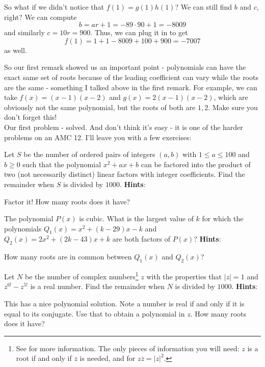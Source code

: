\documentclass[11pt,titlepage]{scrartcl}
\newenvironment{hint}{\footnotesize \normalfont \textbf{Hints}:}{\hspace{-0.5ex}}
\begin{document}
\begin{remark}
So what if we didn't notice that $f(1)=g(1)h(1)$? We can still find $b$ and $c$, right? We can compute
\[b=ar+1=-89\cdot 90+1=-8009\]
and similarly $c=10r=900$. Thus, we can plug it in to get
\[f(1)=1+1-8009+100+900=-7007\]
as well.
\end{remark}
So our first remark showed us an important point - polynomials can have the exact same set of roots because of the leading coefficient can vary while the roots are the same - something I talked above in the first remark. For example, we can take $f(x)=(x-1)(x-2)$ and $g(x)=2(x-1)(x-2)$, which are obviously not the same polynomial, but the roots of both are $1,2$. Make sure you don't forget this!\\[2\baselineskip]
Our first problem - solved. And don't think it's easy - it is one of the harder problems on an AMC 12. I'll leave you with a few exercises:
\begin{exercisebox}
\begin{exercise}
Let $S$ be the number of ordered pairs of integers $(a,b)$ with $1 \leq a \leq 100$ and $b \geq 0$ such that the polynomial $x^2+ax+b$ can be factored into the product of two (not necessarily distinct) linear factors with integer coefficients. Find the remainder when $S$ is divided by $1000$.
\begin{hint}
\begin{addhint}{
Factor it! How many roots does it have?
}\end{addhint}
\end{hint}
\end{exercise}
\begin{exercise}
The polynomial $P(x)$ is cubic. What is the largest value of $k$ for which the polynomials $Q_1(x) = x^2 + (k-29)x - k$ and $Q_2(x) = 2x^2+ (2k-43)x + k$ are both factors of $P(x)$?
\begin{hint}
\begin{addhint}{
How many roots are in common between $Q_1(x)$ and $Q_2(x)$?
}\end{addhint}
\end{hint}
\end{exercise}
\begin{exercise}
Let $N$ be the number of complex numbers\footnote{See  for more information. The only pieces of information you will need: $z$ is a root if and only if $\overline z$ is needed, and for $z\overline z=|z|^2$.} $z$ with the properties that $|z|=1$ and $z^{6!}-z^{5!}$ is a real number. Find the remainder when $N$ is divided by $1000$.
\begin{hint}
\begin{addhint}{
This has a nice polynomial solution. Note a number is real if and only if it is equal to its conjugate. Use that to obtain a polynomial in $z$. How many roots does it have?
}\end{addhint}
\end{hint}
\end{exercise}
\end{exercisebox}
\end{document}
